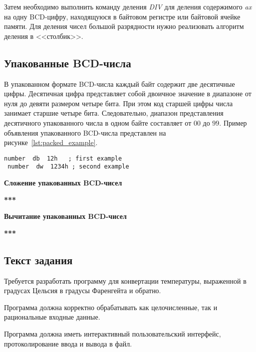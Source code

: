 Затем необходимо выполнить команду деления \textit{DIV} для деления содержимого
\textit{ax} на одну BCD-цифру, находящуюся в байтовом регистре или байтовой ячейке памяти.
Для деления чисел большой разрядности нужно реализовать алгоритм деления в <<столбик>>.

\subsection{Упакованные BCD-числа}
\label{sub:packed}

В упакованном формате BCD-числа каждый байт содержит две десятичные цифры.
Десятичная цифра представляет собой двоичное значение в диапазоне от нуля до девяти
размером четыре бита. При этом код старшей цифры числа занимает старшие четыре бита.
Следовательно, диапазон представления десятичного упакованного числа в одном байте
составляет от $ 00 $ до $ 99 $. Пример объявления упакованного BCD-числа представлен
на рисунке~\ref{lst:packed_example}.

\begin{lstlisting}[caption=Пример объявления упакованного BCD-числа,label=lst:packed_example,
language={[x86masm]Assembler}]
 number  db  12h   ; first example
 number  dw  1234h ; second example
\end{lstlisting}

\textbf{Сложение упакованных BCD-чисел}

\textbf{***}

\textbf{Вычитание упакованных BCD-чисел}

\textbf{***}

\subsection{Текст задания}

Требуется разработать программу для конвертации температуры, выраженной 
в градусах Цельсия в градусы Фаренгейта и обратно.

Программа должна корректно обрабатывать как целочисленные,
так и рациональные входные данные.

Программа должна иметь интерактивный пользовательский интерфейс,
протоколирование ввода и вывода в файл.

\newpage
